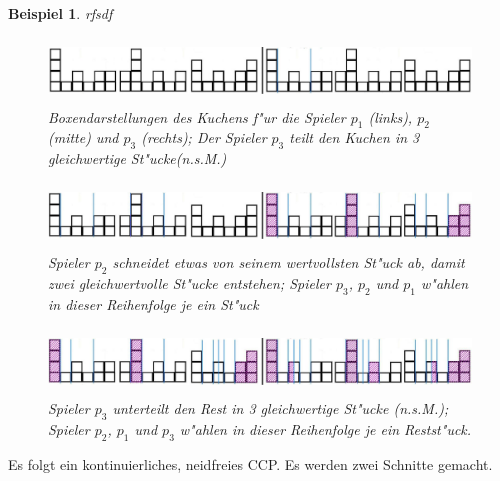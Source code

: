 \documentclass[11pt, a4paper, twoside]{article}
\newcommand{\wf}{\color{white}}
\newtheorem{bsp}[satz]{Beispiel}
\numberwithin{equation}{section}
\begin{document}
\begin{bsp}\wf rfsdf
\begin{figure}[h!]
\includegraphics[height=1.73cm]{scc.jpg}
\caption[Beispiel zum Selfridge-Conway-Protokoll 1/3]{Boxendarstellungen des Kuchens f"ur die Spieler $p_1$ (links), $p_2$ (mitte) und $p_3$ (rechts); Der Spieler $p_3$ teilt den Kuchen in 3 gleichwertige St"ucke(n.s.M.)}
\end{figure}
\begin{figure}[h!]
\includegraphics[height=1.75cm]{scc2.jpg}
\caption[Beispiel zum Selfridge-Conway-Protokoll 2/3]{Spieler $p_2$ schneidet etwas von seinem wertvollsten St"uck ab, damit zwei gleichwertvolle St"ucke entstehen; Spieler $p_3$, $p_2$ und $p_1$ w"ahlen in dieser Reihenfolge je ein St"uck}
\end{figure}
\begin{figure}[h!]
\includegraphics[height=1.75cm]{scc4.jpg}
\caption[Beispiel zum Selfridge-Conway-Protokoll 3/3]{Spieler $p_3$ unterteilt den Rest in 3 gleichwertige St"ucke (n.s.M.); Spieler $p_2$, $p_1$ und $p_3$ w"ahlen in dieser Reihenfolge je ein Restst"uck.}
\end{figure}
\end{bsp}
Es folgt ein kontinuierliches, neidfreies CCP. Es werden zwei Schnitte gemacht.\\
\newline
\end{document}
